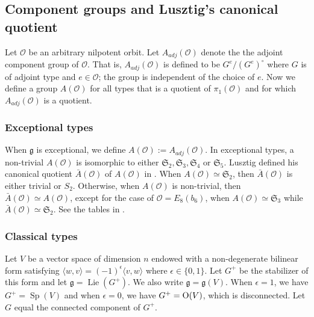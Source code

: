 \documentclass{amsart}
\theoremstyle{definition}
\DeclareMathOperator{\Sp}{Sp}
\newcommand{\g}{\mathfrak{g}}
\newcommand{\frakS}{\mathfrak{S}}
\newcommand{\0}{\mathcal{O}}
\begin{document}
\subsection{Component groups and Lusztig's canonical quotient}\label{Canonical}\label{sec:component_groups_canonial_quotient}

Let $\0$ be an arbitrary nilpotent orbit. Let $A_{adj}(\0)$ denote the the adjoint component group of $\0$.  That is, $A_{adj}(\0)$ is defined 
to be $G^e/(G^e)^\circ$ where $G$ is of adjoint type and $e \in \0$; the group is independent of the choice of $e$.  Now we define a group $A(\0)$ for all types that is a quotient of $\pi_1(\0)$ and for which $A_{adj}(\0)$ is a quotient.

\subsubsection{Exceptional types}
When $\g$ is exceptional, we define $A(\0) := A_{adj}(\0)$. 
In exceptional types, a non-trivial $A(\0)$ is isomorphic to either $\frakS_2,\frakS_3, \frakS_4$ or $\frakS_5$.
Lusztig defined his canonical quotient $\bar{A}(\0)$ of $A(\0)$ in \cite{Lusztig1984}.  When $A(\0) \simeq \frakS_2$,
then $\bar{A}(\0)$ is either trivial or $S_2$.  Otherwise, when $A(\0)$ is non-trivial, then $\bar{A}(\0) \simeq A(\0)$, except 
for the case of $\0 = E_8(b_6)$, when $A(\0) \simeq \frakS_3$ while $\bar{A}(\0) \simeq \frakS_2$.  See the tables in \cite{Sommers:Duality}.

\subsubsection{Classical types}\label{subsub:classical_component_groups}

Let $V$ be a vector space of dimension $n$ endowed with a
non-degenerate bilinear form satisfying
$\langle w,v\rangle=(-1)^\epsilon\langle v,w\rangle$
where $\epsilon \in \{0,1\}$.
Let $G^+$ be the stabilizer of this form and let
$\mathfrak g=\operatorname{Lie}(G^+)$. We also write
$\mathfrak g=\mathfrak g(V)$. 
When $\epsilon = 1$, we have $G^+ = \Sp(V)$
and when $\epsilon = 0$, we have $G^+ = {\rm O}(V)$, which is disconnected.
Let $G$ equal the connected component of $G^+$.
\end{document}
